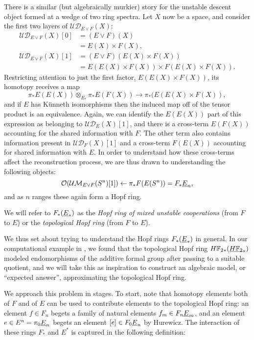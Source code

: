 There is a similar (but algebraically murkier) story for the unstable descent object formed at a wedge of two ring spectra.  Let \(X\) now be a space, and consider the first two layers of \(\mathcal{UD}_{E \vee F}(X)\):
\begin{align*}
\mathcal{UD}_{E \vee F}(X)[0] & = (E \vee F)(X) \\
& = E(X) \times F(X), \\
\mathcal{UD}_{E \vee F}(X)[1] & = (E \vee F)(E(X) \times F(X)) \\
& = E(E(X) \times F(X)) \times F(E(X) \times F(X)).
\end{align*}
Restricting attention to just the first factor, \(E(E(X) \times F(X))\), its homotopy receives a map \[\pi_* E(E(X)) \otimes_{E_*} \pi_* E(F(X)) \to \pi_*(E(E(X) \times F(X)),\] and if \(E\) has K\"unneth isomorphisms then the induced map off of the tensor product is an equivalence.  Again, we can identify the \(E(E(X))\) part of this expression as belonging to \(\mathcal{UD}_E(X)[1]\), and there is a cross-term \(E(F(X))\) accounting for the shared information with \(F\).  The other term also contains information present in \(\mathcal{UD}_F(X)[1]\) and a cross-term \(F(E(X))\) accounting for shared information with \(E\).  In order to understand how these cross-terms affect the reconstruction process, we are thus drawn to understanding the following objects: \[\mathcal{O}(\mathcal{UM}_{E \vee F}(S^n)[1]) \leftarrow \pi_* F(E(S^n)) = F_* \underline{\smash{E}}_{n},\] and as \(n\) ranges these again form a Hopf ring.

\begin{definition}
We will refer to \(F_*(\underline{\smash{E}}_{*})\) as the \textit{Hopf ring of mixed unstable cooperations} (from \(F\) to \(E\)) or the \textit{topological Hopf ring} (from \(F\) to \(E\)).
\end{definition}

We thus set about trying to understand the Hopf rings \(F_*(\underline{\smash{E}}_{*})\) in general.  In our computational example in , we found that the topological Hopf ring \(\HFtwo_*(\OS{\HFtwo}{*})\) modeled endomorphisms of the additive formal group after passing to a suitable quotient, and we will take this as inspiration to construct an algebraic model, or ``expected answer'', approximating the topological Hopf ring.

We approach this problem in stages.  To start, note that homotopy elements both of \(F\) and of \(E\) can be used to contribute elements to the topological Hopf ring: an element \(f \in F_n\) begets a family of natural elements \(f_m \in F_n \underline{\smash{E}}_{m}\), and an element \(e \in E^n = \pi_0 \underline{\smash{E}}_{n}\) begets an element \([e] \in F_0 \underline{\smash{E}}_{n}\) by Hurewicz.  The interaction of these rings \(F_*\) and \(E^*\) is captured in the following definition:

